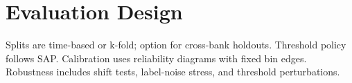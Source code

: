 
\section{Evaluation Design}
Splits are time-based or k-fold; option for cross-bank holdouts. Threshold policy follows SAP. Calibration uses reliability diagrams with fixed bin edges. Robustness includes shift tests, label-noise stress, and threshold perturbations.
